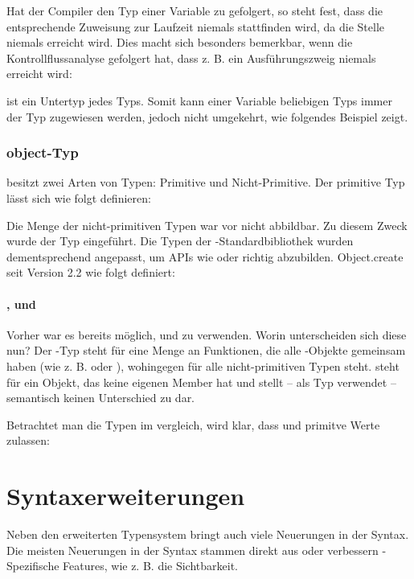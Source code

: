 
Hat der Compiler den Typ einer Variable zu \tsnever gefolgert, so steht fest, dass die entsprechende Zuweisung zur Laufzeit niemals stattfinden wird, da die Stelle niemals erreicht wird. Dies macht sich besonders bemerkbar, wenn die Kontrollflussanalyse gefolgert hat, dass z. B. ein Ausführungszweig niemals erreicht wird:


\tsnever ist ein Untertyp jedes Typs. Somit kann einer Variable beliebigen Typs immer der Typ \tsnever zugewiesen werden, jedoch nicht umgekehrt, wie folgendes Beispiel zeigt.


\subsubsection{object-Typ}
\js besitzt zwei Arten von Typen: Primitive und Nicht-Primitive. Der primitive Typ lässt sich wie folgt definieren:


Die Menge der nicht-primitiven Typen war vor  nicht abbildbar. Zu diesem Zweck wurde der Typ \tsobject eingeführt. Die Typen der \js-Standardbibliothek wurden dementsprechend angepasst, um APIs wie  oder  richtig abzubilden. Object.create seit Version 2.2 wie folgt definiert:


\paragraph*{\tsObject, \tsobject und \tsobj}
Vorher war es bereits möglich, \tsObject und \tsobj zu verwenden. Worin unterscheiden sich diese nun? Der \tsObject-Typ steht für eine Menge an Funktionen, die alle \js-Objekte gemeinsam haben (wie z. B.  oder ), wohingegen \tsobject für alle nicht-primitiven Typen steht.
\tsobj steht für ein Objekt, das keine eigenen Member hat und stellt -- als Typ verwendet -- semantisch keinen Unterschied zu \tsObject dar.

Betrachtet man die Typen im vergleich, wird klar, dass \tsObject und \tsobj primitve Werte zulassen:



\section{Syntaxerweiterungen}
Neben den erweiterten Typensystem bringt  auch viele Neuerungen in der Syntax. Die meisten Neuerungen in der Syntax stammen direkt aus \esss oder verbessern \ts-Spezifische Features, wie z. B. die Sichtbarkeit.

